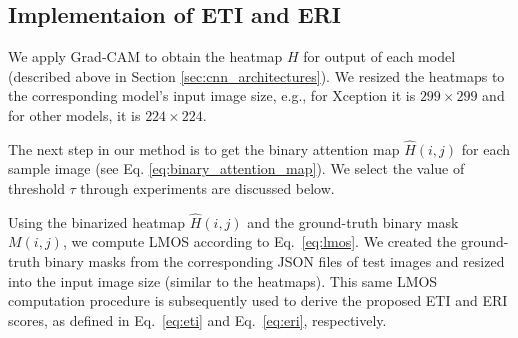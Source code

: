 \documentclass[a4paper,fleqn]{cas-dc}
\begin{document}
	
	\subsection{Implementaion of ETI and ERI}
	\label{sec:justification_of_tau}
	We apply Grad-CAM \cite{ref7} to obtain the heatmap $H$ for output of each model (described above in Section \ref{sec:cnn_architectures}). 
	We resized the heatmaps  to the corresponding model's input image size, e.g., for Xception it is $299 \times 299$ and for other models, it is $224\times224$. 
	
	The next step in our method is to get the binary attention map $\hat{H}(i,j)$ for each sample image (see Eq. \ref{eq:binary_attention_map}).  
	We select the value of threshold $\tau$ through experiments are discussed below. 
	
	Using the binarized heatmap $\hat{H}(i,j)$ and the ground-truth binary mask $M(i,j)$, we compute LMOS according to Eq.~\ref{eq:lmos}. 
	We created the ground-truth binary masks from the corresponding JSON files of test images and resized into the input image size (similar to the heatmaps). This same LMOS computation procedure is subsequently used to derive the proposed ETI and ERI scores, as defined in Eq.~\ref{eq:eti} and Eq.~\ref{eq:eri}, respectively.
	
\end{document}
